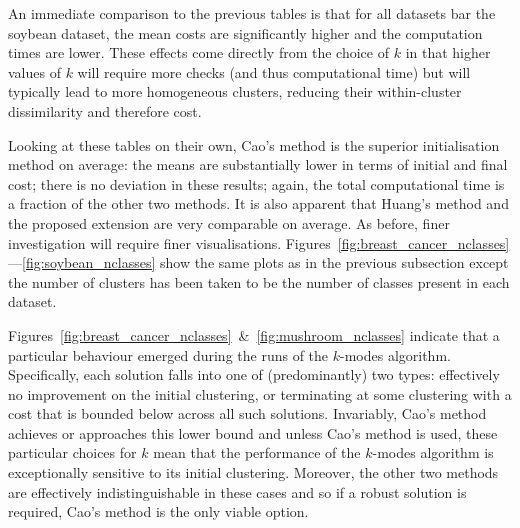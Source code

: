 \documentclass[smallextended]{svjour3}
\newlength{\tablewidth}
\begin{document}
\begin{table}[htbp]
{    }
    \label{tab:nursery_nclasses}\vspace{20pt}

    \label{tab:soybean_nclasses}
\end{table}

An immediate comparison to the previous tables is that for all datasets bar the
soybean dataset, the mean costs are significantly higher and the computation
times are lower. These effects come directly from the choice of \(k\) in that
higher values of \(k\) will require more checks (and thus computational time)
but will typically lead to more homogeneous clusters, reducing their
within-cluster dissimilarity and therefore cost.

Looking at these tables on their own, Cao's method is the superior
initialisation method on average: the means are substantially lower in terms of
initial and final cost; there is no deviation in these results; again, the total
computational time is a fraction of the other two methods. It is also apparent
that Huang's method and the proposed extension are very comparable on average.
As before, finer investigation will require finer visualisations.
Figures~\ref{fig:breast_cancer_nclasses}---\ref{fig:soybean_nclasses} show the
same plots as in the previous subsection except the number of clusters has been
taken to be the number of classes present in each dataset.

Figures~\ref{fig:breast_cancer_nclasses}~\&~\ref{fig:mushroom_nclasses} indicate
that a particular behaviour emerged during the runs of the \(k\)-modes
algorithm. Specifically, each solution falls into one of (predominantly) two
types: effectively no improvement on the initial clustering, or terminating at
some clustering with a cost that is bounded below across all such solutions.
Invariably, Cao's method achieves or approaches this lower bound and unless
Cao's method is used, these particular choices for \(k\) mean that the
performance of the \(k\)-modes algorithm is exceptionally sensitive to its
initial clustering. Moreover, the other two methods are effectively
indistinguishable in these cases and so if a robust solution is required, Cao's
method is the only viable option.
\end{document}
